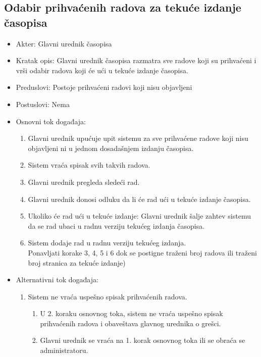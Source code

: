 \documentclass[a4paper]{article}
\begin{document}
\subsection{Odabir prihvaćenih radova za tekuće izdanje časopisa}
\begin{itemize}
    \item Akter: Glavni urednik časopisa
    \item Kratak opis: Glavni urednik časopisa razmatra sve radove koji su prihvaćeni i vrši odabir radova koji će ući u tekuće izdanje časopisa.
    \item Preduslovi: Postoje prihvaćeni radovi koji nisu objavljeni
    \item Postuslovi: Nema
    \item Osnovni tok događaja:
        \begin{enumerate}
            \item Glavni urednik upućuje upit sistemu za sve prihvaćene radove koji nisu objavljeni ni u jednom dosadašnjem izdanju časopisa.
            \item Sistem vraća spisak svih takvih radova.
            \item Glavni urednik pregleda sledeći rad.
            \item Glavni urednik donosi odluku da li će rad ući u tekuće izdanje časopisa.
            \item Ukoliko će rad ući u tekuće izdanje: Glavni urednik šalje zahtev sistemu da se rad ubaci u radnu verziju tekućeg izdanja časopisa.
            \item Sistem dodaje rad u radnu verziju tekućeg izdanja.\\ Ponavljati korake 3, 4, 5 i 6 dok se postigne traženi broj radova ili traženi broj stranica za tekuće izdanje)
        \end{enumerate}
    \item Alternativni tok događaja:
        \begin{enumerate}
            \item Sistem ne vraća uspešno spisak prihvaćenih radova.
                \begin{enumerate}
                    \item U 2. koraku osnovnog toka, sistem ne vraća uspešno spisak prihvaćenih radova i obaveštava glavnog urednika o grešci.
                    \item Glavni urednik se vraća na 1. korak osnovnog toka ili se obraća se administratoru.
                \end{enumerate}

\end{enumerate}
\end{itemize}
\end{document}
